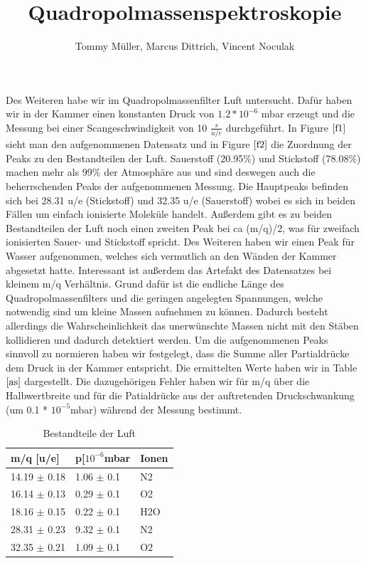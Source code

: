 \documentclass[10pt,a4paper]{article}
\author{Tommy Müller, Marcus Dittrich, Vincent Noculak}
\title{Quadropolmassenspektroskopie}
\begin{document}
Des Weiteren habe wir im Quadropolmassenfilter Luft untersucht. Dafür haben wir in der Kammer einen konstanten Druck von $1.2 * 10^{-6}$ mbar erzeugt und die Messung bei einer Scangeschwindigkeit von 10 $\frac{s}{u/e}$ durchgeführt. In Figure $\ref{f1}$ sieht man den aufgenommenen Datensatz und in Figure $\ref{f2}$ die Zuordnung der Peaks zu den Bestandteilen der Luft. Sauerstoff (20.95$\%$) und Stickstoff (78.08$\%$)  machen mehr als 99$\%$ der Atmosphäre aus und sind deswegen auch die beherrschenden Peaks der aufgenommenen Messung. Die Hauptpeaks befinden sich bei 28.31 u/e (Stickstoff) und 32.35 u/e (Sauerstoff) wobei es sich in beiden Fällen um einfach ionisierte Moleküle handelt. Außerdem gibt es zu beiden Bestandteilen der Luft noch einen zweiten Peak bei ca (m/q)/2, was für zweifach ionisierten Sauer- und Stickstoff spricht. Des Weiteren haben wir einen Peak für Wasser aufgenommen, welches sich vermutlich an den Wänden der Kammer abgesetzt hatte. Interessant ist außerdem das Artefakt des Datensatzes bei kleinem m/q Verhältnis. Grund dafür ist die endliche Länge des Quadropolmassenfilters und die geringen angelegten Spannungen, welche notwendig sind um kleine Massen aufnehmen zu können. Dadurch besteht allerdings die Wahrscheinlichkeit das unerwünschte Massen nicht mit den Stäben kollidieren und dadurch detektiert werden. Um die aufgenommenen Peaks sinnvoll zu normieren haben wir festgelegt, dass die Summe aller Partialdrücke dem Druck in der Kammer entspricht. Die ermittelten Werte haben wir in Table $\ref{as}$ dargestellt. Die dazugehörigen Fehler haben wir für m/q über die Halbwertbreite und für die Patialdrücke aus der auftretenden Druckschwankung (um 0.1 * $10^{-5}$mbar) während der Messung bestimmt. 

\begin{table}[k]
	\centering
	\caption{Bestandteile der Luft}
	\label{as}
	\begin{tabular}{|l|l|l|}
		\hline
		m/q {[}u/e{]} & p{[}$10^{-6}$mbar & Ionen \\ \hline
		14.19 $\pm$ 0.18       & 1.06  $\pm$ 0.1    & N2    \\ \hline
		16.14 $\pm$ 0.13       & 0.29  $\pm$ 0.1    & O2    \\ \hline
		18.16 $\pm$ 0.15       & 0.22  $\pm$ 0.1    & H2O   \\ \hline
		28.31 $\pm$ 0.23       & 9.32  $\pm$ 0.1    & N2    \\ \hline
		32.35 $\pm$ 0.21       & 1.09  $\pm$ 0.1    & O2    \\ \hline
	\end{tabular}
\end{table}
\end{document}
